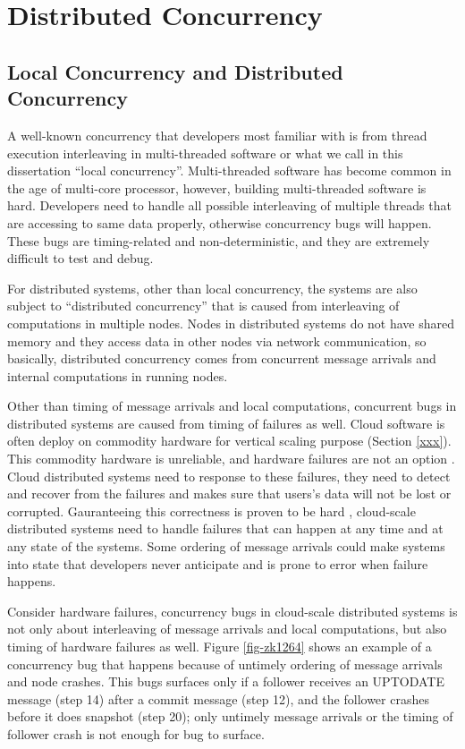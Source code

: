 \section{Distributed Concurrency}
\label{bg-dc}

\subsection{Local Concurrency and Distributed Concurrency}



A well-known concurrency that developers most familiar with is from thread
execution interleaving in multi-threaded software or what we call in this
dissertation ``local concurrency''. Multi-threaded software has become common in
the age of multi-core processor, however, building multi-threaded software is
hard. Developers need to handle all possible interleaving of multiple threads
that are accessing to same data properly, otherwise concurrency bugs will
happen. These bugs are timing-related and non-deterministic, and they are
extremely difficult to test and debug.

For distributed systems, other than local concurrency, the systems are also
subject to ``distributed concurrency'' that is caused from interleaving of
computations in multiple nodes. Nodes in distributed systems do not have shared
memory and they access data in other nodes via network communication, so
basically, distributed concurrency comes from concurrent message arrivals and
internal computations in running nodes.

Other than timing of message arrivals and local computations, concurrent bugs in
distributed systems are caused from timing of failures as well. Cloud software
is often deploy on commodity hardware for vertical scaling purpose (Section
\ref{xxx}). This commodity hardware is unreliable, and hardware failures are not
an option . Cloud distributed systems need to
response to these failures, they need to detect and recover from the failures
and makes sure that users's data will not be lost or corrupted. Gauranteeing
this correctness is proven to be hard ,
cloud-scale distributed systems need to handle failures that can happen at any
time and at any state of the systems. Some ordering of message arrivals could
make systems into state that developers never anticipate and is prone to error
when failure happens.

Consider hardware failures, concurrency bugs in cloud-scale distributed systems
is not only about interleaving of message arrivals and local computations, but
also timing of hardware failures as well. Figure \ref{fig-zk1264} shows an
example of a concurrency bug that happens because of untimely ordering of
message arrivals and node crashes. This bugs surfaces only if a follower
receives an UPTODATE message (step 14) after a commit message (step 12), and the
follower crashes before it does snapshot (step 20); only untimely message
arrivals or the timing of follower crash is not enough for bug to surface.

